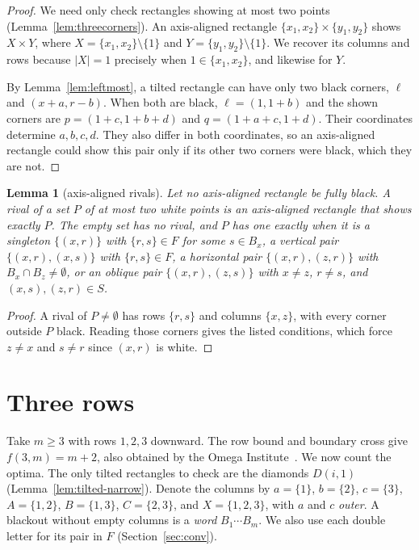 \documentclass[12pt]{article}
\theoremstyle{plain}
\newtheorem{lemma}[theorem]{Lemma}
\theoremstyle{definition}
\theoremstyle{remark}
\begin{document}
\begin{proof}
We need only check rectangles showing at most two points
(Lemma~\ref{lem:threecorners}). An axis-aligned rectangle
$\{x_1,x_2\}\times\{y_1,y_2\}$ shows $X\times Y$, where
$X=\{x_1,x_2\}\setminus\{1\}$ and $Y=\{y_1,y_2\}\setminus\{1\}$.
We recover its columns and rows because $|X|=1$ precisely when
$1\in\{x_1,x_2\}$, and likewise for $Y$.

By Lemma~\ref{lem:leftmost}, a tilted rectangle can have only two black
corners, $\ell$ and $(x+a,r-b)$. When both are black,
$\ell=(1,1+b)$ and the shown corners are $p=(1+c,1+b+d)$ and
$q=(1+a+c,1+d)$. Their coordinates determine $a,b,c,d$. They also differ
in both coordinates, so an axis-aligned rectangle could show this pair
only if its other two corners were black, which they are not.
\end{proof}

\begin{lemma}[axis-aligned rivals]\label{lem:rival}
Let no axis-aligned rectangle be fully black. A \emph{rival} of a set $P$ of at most two white points is an axis-aligned rectangle that shows exactly $P$. The empty set has no rival, and $P$ has one exactly when it is a singleton $\{(x,r)\}$ with $\{r,s\}\in F$ for some $s\in B_x$, a vertical pair $\{(x,r),(x,s)\}$ with $\{r,s\}\in F$, a horizontal pair $\{(x,r),(z,r)\}$ with $B_x\cap B_z\ne\emptyset$, or an oblique pair $\{(x,r),(z,s)\}$ with $x\ne z$, $r\ne s$, and $(x,s),(z,r)\in S$.
\end{lemma}

\begin{proof}
A rival of $P\ne\emptyset$ has rows $\{r,s\}$ and columns $\{x,z\}$,
with every corner outside $P$ black. Reading those corners gives the
listed conditions, which force $z\ne x$ and $s\ne r$ since $(x,r)$ is white.
\end{proof}
\section{Three rows}\label{sec:three}

Take $m\ge3$ with rows $1,2,3$ downward. The row bound and boundary cross
give $f(3,m)=m+2$, also obtained by the Omega Institute~\cite{trureturing2026}.
We now count the optima. The only tilted rectangles to check are the diamonds
$D(i,1)$ (Lemma~\ref{lem:tilted-narrow}). Denote the columns by $a=\{1\}$, $b=\{2\}$, $c=\{3\}$,
$A=\{1,2\}$, $B=\{1,3\}$, $C=\{2,3\}$, and $X=\{1,2,3\}$, with $a$ and $c$ \emph{outer}. A
blackout without empty columns is a \emph{word} $B_1\cdots B_m$. We also use each
double letter for its pair in $F$ (Section~\ref{sec:conv}).
\end{document}
